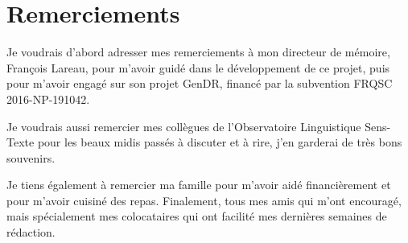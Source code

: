 \chapter*{Remerciements}

Je voudrais d'abord adresser mes remerciements à mon directeur de mémoire, François Lareau, pour m'avoir guidé dans le développement de ce projet, puis pour m’avoir engagé sur son projet GenDR, financé par la subvention FRQSC 2016-NP-191042.

Je voudrais aussi remercier mes collègues de l’Observatoire Linguistique Sens-Texte pour les beaux midis passés à discuter et à rire, j'en garderai de très bons souvenirs.

Je tiens également à remercier ma famille pour m'avoir aidé financièrement et pour m'avoir cuisiné des repas. Finalement, tous mes amis qui m'ont encouragé, mais spécialement mes colocataires qui ont facilité mes dernières semaines de rédaction.


\NoChapterPageNumber 


